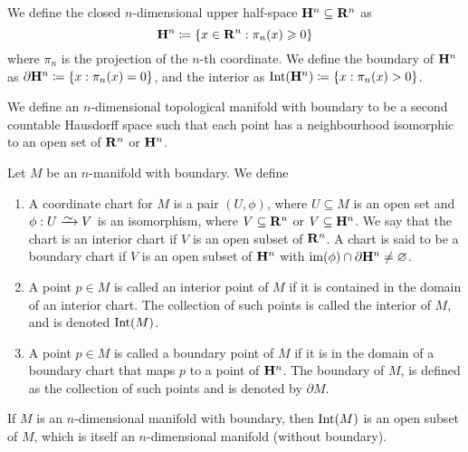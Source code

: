 \begin{definition}\label{def:upper-half-space}
We define the closed \(n\)-dimensional upper half-space \(\mathbf{H}^n \subseteq
\mathbf{R}^n\) as
\[
  \mathbf{H}^n \coloneqq \{x \in \mathbf{R}^n : \pi_n(x) \geqslant 0\}
\]
where \(\pi_n\) is the projection of the \(n\)-th coordinate. We define the
boundary of \(\mathbf{H}^n\) as \(\partial \mathbf{H}^n \coloneqq \{x : \pi_n(x) = 0\}\),
and the interior as \(\operatorname{Int}(\mathbf{H}^n) \coloneqq \{x : \pi_n(x) > 0\}\).
\end{definition}

\begin{definition}
\label{def: manifold with boundary}
We define an \(n\)-dimensional topological manifold with boundary to be a
second countable Hausdorff space such that each point has a neighbourhood
isomorphic to an open set of \(\mathbf{R}^n\) or \(\mathbf{H}^n\).
\end{definition}

\begin{definition}[Miscelaneous]
Let \(M\) be an \(n\)-manifold with boundary. We define
\begin{enumerate}[(MB1)]
  \item A coordinate chart for \(M\) is a pair \((U, \phi)\), where \(U
    \subseteq M\) is an open set and \(\phi: U \isoto V\) is an isomorphism,
    where \(V \subseteq \mathbf{R}^n\) or \(V \subseteq \mathbf{H}^n\). We say that the chart
    is an interior chart if \(V\) is an open subset of \(\mathbf{R}^n\). A chart is said
    to be a boundary chart if \(V\) is an open subset of \(\mathbf{H}^n\) with
    \(\operatorname{im}(\phi) \cap \partial \mathbf{H}^n \neq \varnothing\).
  \item A point \(p \in M\) is called an interior point of \(M\) if it is
    contained in the domain of an interior chart. The collection of such
    points is called the interior of \(M\), and is denoted \(\operatorname{Int}(M)\).
  \item A point \(p \in M\) is called a boundary point of \(M\) if it is in
    the domain of a boundary chart that maps \(p\) to a point of
    \(\mathbf{H}^n\). The boundary of \(M\), is defined as the collection of
    such points and is denoted by \(\partial M\).
\end{enumerate}
\end{definition}

\begin{proposition}\label{prop: interior is a manifold}
If \(M\) is an \(n\)-dimensional manifold with boundary, then \(\operatorname{Int}(M)\) is
an open subset of \(M\), which is itself an \(n\)-dimensional manifold
(without boundary).
\end{proposition}

